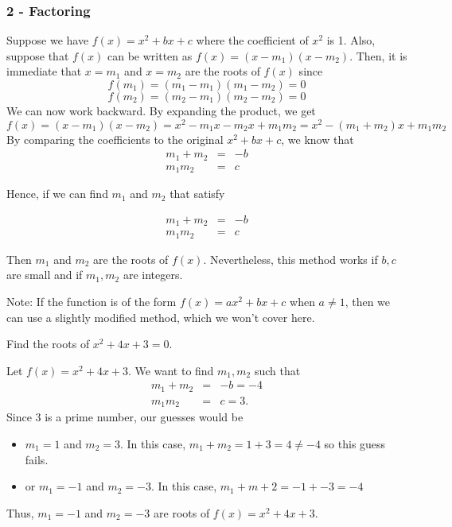 \begin{frame}
\frametitle{2 - Factoring}
Suppose we have $f(x) = x^2 +bx+c$ where the coefficient of $x^2$ is 1. Also, suppose that $f(x)$ can be written as $f(x) = (x-m_1)(x-m_2)$. Then, it is immediate that $x=m_1$ and $x=m_2$ are the roots of $f(x)$ since
\[ f(m_1) = (m_1-m_1)(m_1-m_2) = 0\]
\[ f(m_2) = (m_2-m_1)(m_2-m_2) = 0\]
We can now work backward. By expanding the product, we get
\[ f(x) = (x-m_1)(x-m_2) = x^2 -m_1x - m_2x + m_1m_2 = x^2 - (m_1+m_2)x + m_1m_2\]
By comparing the coefficients to the original $x^2 + bx + c$, we know that
\begin{eqnarray*}
m_1+m_2 &=& -b\\
m_1m_2 &=& c
\end{eqnarray*}
\end{frame}

\begin{frame}
Hence, if we can find $m_1$ and $m_2$ that satisfy 
\begin{block}{}
\begin{eqnarray*}
m_1+m_2 &=& -b\\
m_1m_2 &=& c
\end{eqnarray*}
\end{block}
Then $m_1$ and $m_2$ are the roots of $f(x)$. Nevertheless, this method works if $b,c$ are small and if $m_1,m_2$ are integers.
\bigskip

Note: If the function is of the form $f(x) = ax^2 + bx + c$ when $a \neq 1$, then we can use a slightly modified method, which we won't cover here.
\end{frame}



\begin{frame}[t]
\begin{ex}
Find the roots of $x^2+4x+3=0$.
\end{ex}
\begin{sol}
Let $f(x) = x^2 +4x+3$. We want to find $m_1,m_2$ such that
\begin{eqnarray*}
m_1 + m_2 &=& -b = -4 \\
m_1m_2 &=& c = 3.
\end{eqnarray*}
Since 3 is a prime number, our guesses would be 
\begin{itemize}
\item $m_1 = 1$ and $m_2 = 3$. In this case, $m_1 + m_2 = 1+3=4 \neq -4$ so this guess fails.
\item or $m_1 = -1$ and $m_2 = -3$. In this case, $m_1 + m+2 = -1+-3 = -4$
\end{itemize}
Thus, $m_1 = -1$ and $m_2 = -3$ are roots of $f(x) = x^2 + 4x + 3$.
\end{sol}
\end{frame}

